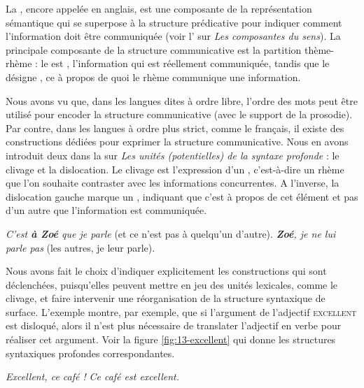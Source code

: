 {La , encore appelée  en anglais, est une composante de la représentation sémantique qui se superpose à la structure prédicative pour indiquer comment l’information doit être communiquée (voir l’ sur \textit{Les composantes du sens}). La principale composante de la structure communicative est la partition thème-rhème : le  est , l’information qui est réellement communiquée, tandis que le  désigne , ce à propos de quoi le rhème communique une information.  

Nous avons vu que, dans les langues dites à ordre libre, l’ordre des mots peut être utilisé pour encoder la structure communicative (avec le support de la prosodie). Par contre, dans les langues à ordre plus strict, comme le français, il existe des constructions dédiées pour exprimer la structure communicative. Nous en avons introduit deux dans la  sur \textit{Les unités (potentielles) de la syntaxe profonde} : le clivage et la dislocation. Le clivage est l’expression d’un , c’est-à-dire un rhème que l’on souhaite contraster avec les informations concurrentes. A l’inverse, la dislocation gauche marque un , indiquant que c’est à propos de cet élément et pas d’un autre que l’information est communiquée.

\ea
\ea \textit{C’est \textbf{à Zoé} que je parle} (et ce n’est pas à quelqu’un d’autre).
\ex \textit{\textbf{Zoé}, je ne lui parle pas} (les autres, je leur parle).\z\z

Nous avons fait le choix d’indiquer explicitement les constructions qui sont déclenchées, puisqu’elles peuvent mettre en jeu des unités lexicales, comme le clivage, et faire intervenir une réorganisation de la structure syntaxique de surface. L’exemple  montre, par exemple, que si l’argument de l’adjectif \textsc{excellent} est disloqué, alors il n’est plus nécessaire de translater l’adjectif en verbe pour réaliser cet argument. Voir la figure \ref{fig:13-excellent} qui donne les structures syntaxiques profondes correspondantes.

\ea\label{ex:13-excellent}
\ea \textit{Excellent, ce café !}
\ex \textit{Ce café est excellent.}\z\z

}
